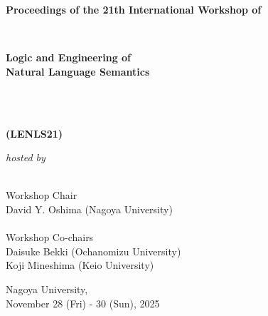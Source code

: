 \documentclass[12pt]{jarticle}
\begin{document}
\pagestyle{empty}

\vspace*{1cm}

\begin{center}

\begin{Large}
{\bf Proceedings of the 21th International Workshop of}
\end{Large} 
\\
\begin{huge}
{\bf Logic and Engineering of \\
Natural Language Semantics} 
\end{huge}
\\\ \\
\begin{huge}
{\bf (LENLS21)}
\end{huge}

\vspace*{1cm}

\begin{Large}
{\em hosted by \\\ \\ }
\end{Large}

\begin{large}
\vspace*{1cm}
Workshop Chair\\ $\;$\\
David Y. Oshima (Nagoya University) \\
\ \\
Workshop Co-chairs\\ $\;$\\
Daisuke Bekki (Ochanomizu University) \\
Koji Mineshima (Keio University) \\

\end{large}

\vspace*{3cm}


\vspace*{1cm}

\begin{large}
Nagoya University, \\
November 28 (Fri) - 30 (Sun), 2025
\end{large}
\vfill

\end{center}
\end{document}
